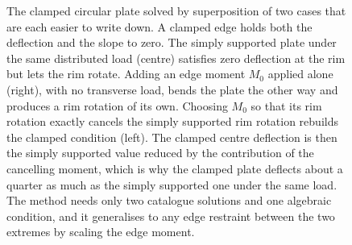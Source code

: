 \begin{figure}[htbp]
\caption[Clamped plate by superposition]{The clamped circular plate solved
by superposition of two cases that are each easier to write down. A clamped
edge holds both the deflection and the slope to zero. The simply supported
plate under the same distributed load (centre) satisfies zero deflection at
the rim but lets the rim rotate. Adding an edge moment $M_0$ applied alone
(right), with no transverse load, bends the plate the other way and produces
a rim rotation of its own. Choosing $M_0$ so that its rim rotation exactly
cancels the simply supported rim rotation rebuilds the clamped condition
(left). The clamped centre deflection is then the simply supported value
reduced by the contribution of the cancelling moment, which is why the
clamped plate deflects about a quarter as much as the simply supported one
under the same load. The method needs only two catalogue solutions and one
algebraic condition, and it generalises to any edge restraint between the
two extremes by scaling the edge moment.}
\label{fig:vol03ch09:clamped-superposition}
\end{figure}

